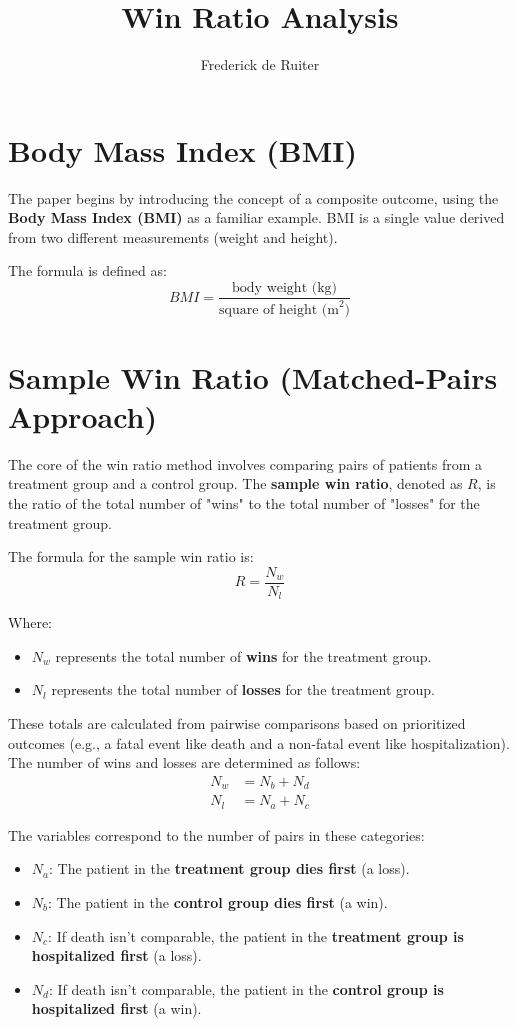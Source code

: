 \documentclass{article}
\title{Win Ratio Analysis}
\author{Frederick de Ruiter}
\date{}
\begin{document}
\maketitle

\section{Body Mass Index (BMI)}

The paper begins by introducing the concept of a composite outcome, using the \textbf{Body Mass Index (BMI)} as a familiar example. BMI is a single value derived from two different measurements (weight and height).

The formula is defined as:
\begin{equation}
BMI = \frac{\text{body weight (kg)}}{\text{square of height (m}^2\text{)}}
\end{equation}

\section{Sample Win Ratio (Matched-Pairs Approach)}

The core of the win ratio method involves comparing pairs of patients from a treatment group and a control group. The \textbf{sample win ratio}, denoted as $R$, is the ratio of the total number of "wins" to the total number of "losses" for the treatment group.

The formula for the sample win ratio is:
\begin{equation}
R = \frac{N_w}{N_l}
\end{equation}

Where:
\begin{itemize}
    \item $N_w$ represents the total number of \textbf{wins} for the treatment group.
    \item $N_l$ represents the total number of \textbf{losses} for the treatment group.
\end{itemize}

These totals are calculated from pairwise comparisons based on prioritized outcomes (e.g., a fatal event like death and a non-fatal event like hospitalization). The number of wins and losses are determined as follows:
\begin{align}
N_w &= N_b + N_d \\
N_l &= N_a + N_c
\end{align}

The variables correspond to the number of pairs in these categories:
\begin{itemize}
    \item $N_a$: The patient in the \textbf{treatment group dies first} (a loss).
    \item $N_b$: The patient in the \textbf{control group dies first} (a win).
    \item $N_c$: If death isn't comparable, the patient in the \textbf{treatment group is hospitalized first} (a loss).
    \item $N_d$: If death isn't comparable, the patient in the \textbf{control group is hospitalized first} (a win).
\end{itemize}
\end{document}
